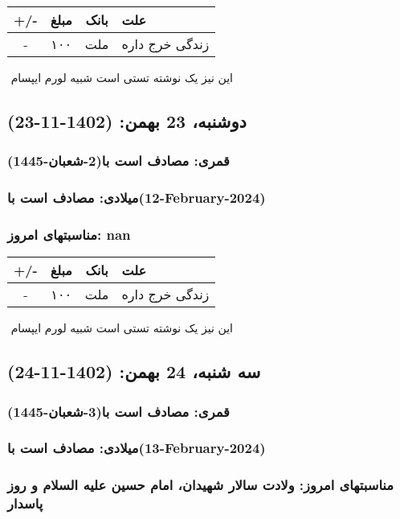 \documentclass{article}
\newcommand{\rnote}[1]{\marginpar{\textcolor{color}{\StrSubstitute{\##1}{ }{\_}}}}
\newcommand{\myRow}[4]{
    #1 & #2 & #3 & #4 \\ \hline
}
\begin{document}
\begin{tabular}{ | c | c | c | p{5cm} |}
    \hline
    \myRow{ +/- }{مبلغ}{بانک}{علت}
    \myRow{-}{۱۰۰}{ملت}{زندگی خرج داره}
\end{tabular}
\newline
\newline

‌
\rnote{تست}
این نیز یک نوشته تستی است شبیه لورم ایپسام




\newpage
{}
\textcolor{color}{
\section{ دوشنبه، 23 بهمن: (1402-11-23) }
\subsubsection*{قمری: مصادف است با(2-شعبان-1445)} 
\subsubsection*{میلادی: مصادف است با(12-February-2024)}
\subsubsection*{مناسبتهای امروز: nan}
}


\begin{tabular}{ | c | c | c | p{5cm} |}
    \hline
    \myRow{ +/- }{مبلغ}{بانک}{علت}
    \myRow{-}{۱۰۰}{ملت}{زندگی خرج داره}
\end{tabular}
\newline
\newline

‌
\rnote{تست}
این نیز یک نوشته تستی است شبیه لورم ایپسام




\newpage
{}
\textcolor{color}{
\section{ سه شنبه، 24 بهمن: (1402-11-24) }
\subsubsection*{قمری: مصادف است با(3-شعبان-1445)} 
\subsubsection*{میلادی: مصادف است با(13-February-2024)}
\subsubsection*{مناسبتهای امروز: ولادت سالار شهیدان، امام حسین علیه السلام و روز پاسدار}
}
\end{document}
